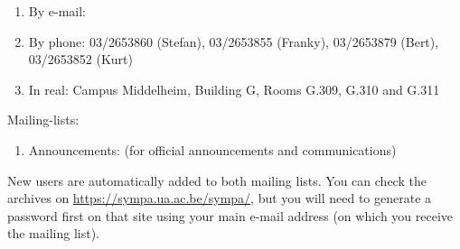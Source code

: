 \begin{enumerate}
\item  By e-mail:  \hpcinfo
\item  By phone: 03/2653860 (Stefan), 03/2653855 (Franky), 03/2653879 (Bert), 03/2653852 (Kurt)
\item  In real: Campus Middelheim, Building G, Rooms G.309, G.310 and G.311
\end{enumerate}

Mailing-lists:

\begin{enumerate}
\item  Announcements: \hpcannounceml (for official announcements and communications)
\end{enumerate}

New users are automatically added to both mailing lists.
You can check the archives on \url{https://sympa.ua.ac.be/sympa/}, but you will need to
generate a password first on that site using your main e-mail address (on which you
receive the mailing list).
